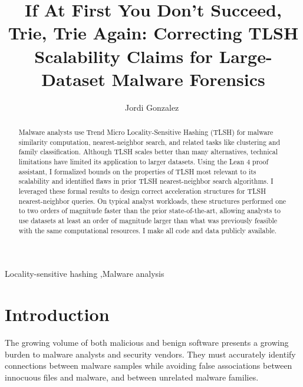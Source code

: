 \documentclass[5p,final]{elsarticle}
\begin{document}
\begin{frontmatter}
	\title{If At First You Don't Succeed, Trie, Trie Again: Correcting
	TLSH Scalability Claims for Large-Dataset Malware Forensics}

	\author[mitre]{Jordi Gonzalez\,\,}



	\begin{abstract}
		Malware analysts use Trend Micro Locality-Sensitive Hashing (TLSH)
		for malware similarity computation, nearest-neighbor search, and
		related tasks like clustering and family classification. Although
		TLSH scales better than many alternatives, technical limitations
		have limited its application to larger datasets. Using the Lean 4
		proof assistant, I formalized bounds on the properties of TLSH most
		relevant to its scalability and identified flaws in prior TLSH
		nearest-neighbor search algorithms. I leveraged these formal
		results to design correct acceleration structures for TLSH
		nearest-neighbor queries. On typical analyst workloads, these
		structures performed one to two orders of magnitude faster than the
		prior state-of-the-art, allowing analysts to use datasets at least
		an order of magnitude larger than what was previously feasible with
		the same computational resources. I make all code and data publicly available.
	\end{abstract}

	\begin{keyword}
		Locality-sensitive hashing \sep Malware analysis
	\end{keyword}
\end{frontmatter}

\section{Introduction}

The growing volume of both malicious and benign software presents a
growing burden to malware analysts and security vendors. They must
accurately identify connections between malware samples while
avoiding false associations between innocuous files and
malware, and between unrelated malware families.
\end{document}
